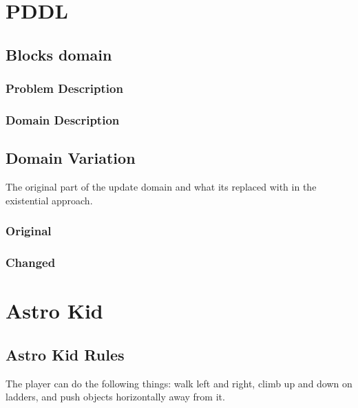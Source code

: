 
\lstset{tabsize=2}
\chapter{PDDL}

\section{Blocks domain}\label{blocks}
\subsection{Problem Description}\label{blocks-prob}

\subsection{Domain Description}\label{blocks-domain}



\section{Domain Variation}\label{Domain_Variation}
The original part of the update domain and what its replaced with in the existential approach.
\subsection{Original}\label{domain}

\subsection{Changed}\label{domain2}


\chapter{Astro Kid}
\section{Astro Kid Rules}

The player can do the following things: walk left and right, climb up and down on ladders, and push objects horizontally away from it.
